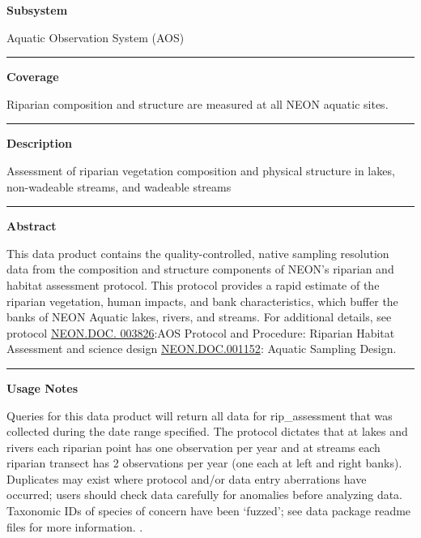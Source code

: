 \documentclass[]{article}
\begin{document}
\textbf{Subsystem}

Aquatic Observation System (AOS)

\begin{center}\rule{0.5\linewidth}{\linethickness}\end{center}

\textbf{Coverage}

Riparian composition and structure are measured at all NEON aquatic
sites.

\begin{center}\rule{0.5\linewidth}{\linethickness}\end{center}

\textbf{Description}

Assessment of riparian vegetation composition and physical structure in
lakes, non-wadeable streams, and wadeable streams

\begin{center}\rule{0.5\linewidth}{\linethickness}\end{center}

\textbf{Abstract}

This data product contains the quality-controlled, native sampling
resolution data from the composition and structure components of NEON's
riparian and habitat assessment protocol. This protocol provides a rapid
estimate of the riparian vegetation, human impacts, and bank
characteristics, which buffer the banks of NEON Aquatic lakes, rivers,
and streams. For additional details, see protocol
\href{http://data.neonscience.org/api/v0/documents/NEON.DOC.003826vB}{NEON.DOC.
003826}:AOS Protocol and Procedure: Riparian Habitat Assessment and
science design
\href{http://data.neonscience.org/api/v0/documents/NEON.DOC.001152vA}{NEON.DOC.001152}:
Aquatic Sampling Design.

\begin{center}\rule{0.5\linewidth}{\linethickness}\end{center}

\textbf{Usage Notes}

Queries for this data product will return all data for rip\_assessment
that was collected during the date range specified. The protocol
dictates that at lakes and rivers each riparian point has one
observation per year and at streams each riparian transect has 2
observations per year (one each at left and right banks). Duplicates may
exist where protocol and/or data entry aberrations have occurred; users
should check data carefully for anomalies before analyzing data.
Taxonomic IDs of species of concern have been `fuzzed'; see data package
readme files for more information. \newpage
.
\end{document}
